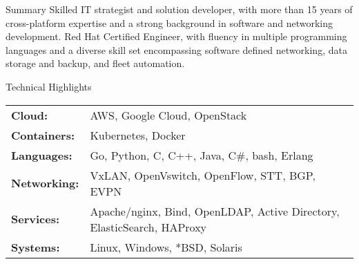 \documentclass{resume}
\begin{document}
    \begin{rSection}{Summary}
        {\small
        Skilled IT strategist and solution developer, with more than 15 years of
        cross-platform expertise and a strong background in software and networking
        development. Red Hat Certified Engineer, with fluency in multiple programming
        languages and a diverse skill set encompassing software defined networking,
        data storage and backup, and fleet automation.
        }
    \end{rSection}

    \begin{rSection}{Technical Highlights}
        {\small
        \bigskip
        \begin{mdframed}[style=techskills]
            \begin{tabular}{l l}
                {\bf Cloud:} & AWS, Google Cloud, OpenStack \\
                {\bf Containers:} & Kubernetes, Docker \\
                {\bf Languages:} & Go, Python, C, C++, Java, C\#, bash, Erlang \\
                {\bf Networking:} & VxLAN, OpenVswitch, OpenFlow, STT, BGP, EVPN \\
                {\bf Services:} & Apache/nginx, Bind, OpenLDAP, Active Directory,
                ElasticSearch, HAProxy \\
                {\bf Systems:} & Linux, Windows, *BSD, Solaris \\
            \end{tabular}
        \end{mdframed}
        }
    \end{rSection}
\end{document}

